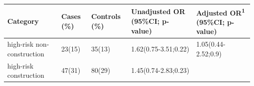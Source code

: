 \begin{longtable}[]{@{}lllll@{}}
\toprule
\begin{minipage}[b]{0.20\columnwidth}\raggedright
Category\strut
\end{minipage} & \begin{minipage}[b]{0.08\columnwidth}\raggedright
Cases (\%)\strut
\end{minipage} & \begin{minipage}[b]{0.10\columnwidth}\raggedright
Controls (\%)\strut
\end{minipage} & \begin{minipage}[b]{0.24\columnwidth}\raggedright
Unadjusted OR (95\%CI; p-value)\strut
\end{minipage} & \begin{minipage}[b]{0.23\columnwidth}\raggedright
Adjusted OR\textsuperscript{1} (95\%CI; p-value)\strut
\end{minipage}\tabularnewline
\midrule
\endhead
\begin{minipage}[t]{0.20\columnwidth}\raggedright
high-risk non-construction\strut
\end{minipage} & \begin{minipage}[t]{0.08\columnwidth}\raggedright
23(15)\strut
\end{minipage} & \begin{minipage}[t]{0.10\columnwidth}\raggedright
35(13)\strut
\end{minipage} & \begin{minipage}[t]{0.24\columnwidth}\raggedright
1.62(0.75-3.51;0.22)\strut
\end{minipage} & \begin{minipage}[t]{0.23\columnwidth}\raggedright
1.05(0.44-2.52;0.9)\strut
\end{minipage}\tabularnewline
\begin{minipage}[t]{0.20\columnwidth}\raggedright
high-risk construction\strut
\end{minipage} & \begin{minipage}[t]{0.08\columnwidth}\raggedright
47(31)\strut
\end{minipage} & \begin{minipage}[t]{0.10\columnwidth}\raggedright
80(29)\strut
\end{minipage} & \begin{minipage}[t]{0.24\columnwidth}\raggedright
1.45(0.74-2.83;0.23)\strut
\end{minipage} & \begin{minipage}[t]{0.23\columnwidth}\raggedright

\end{minipage}
\end{longtable}
